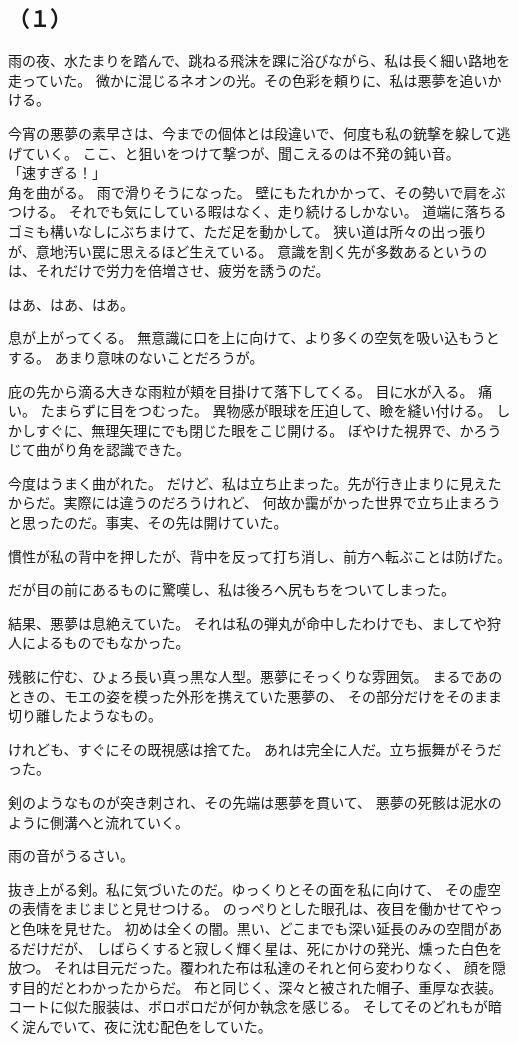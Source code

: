 \documentclass[../IHMain]{subfiles}
\begin{document}
\subsection*{（１）}
雨の夜、水たまりを踏んで、跳ねる飛沫を踝に浴びながら、私は長く細い路地を走っていた。
微かに混じるネオンの光。その色彩を頼りに、私は悪夢を追いかける。

今宵の悪夢の素早さは、今までの個体とは段違いで、何度も私の銃撃を躱して逃げていく。
ここ、と狙いをつけて撃つが、聞こえるのは不発の鈍い音。\\
「速すぎる！」\\
角を曲がる。
雨で滑りそうになった。
壁にもたれかかって、その勢いで肩をぶつける。
それでも気にしている暇はなく、走り続けるしかない。
道端に落ちるゴミも構いなしにぶちまけて、ただ足を動かして。
狭い道は所々の出っ張りが、意地汚い罠に思えるほど生えている。
意識を割く先が多数あるというのは、それだけで労力を倍増させ、疲労を誘うのだ。

はあ、はあ、はあ。

息が上がってくる。
無意識に口を上に向けて、より多くの空気を吸い込もうとする。
あまり意味のないことだろうが。

庇の先から滴る大きな雨粒が頬を目掛けて落下してくる。
目に水が入る。
痛い。
たまらずに目をつむった。
異物感が眼球を圧迫して、瞼を縫い付ける。
しかしすぐに、無理矢理にでも閉じた眼をこじ開ける。
ぼやけた視界で、かろうじて曲がり角を認識できた。

今度はうまく曲がれた。
だけど、私は立ち止まった。先が行き止まりに見えたからだ。実際には違うのだろうけれど、
何故か靄がかった世界で立ち止まろうと思ったのだ。事実、その先は開けていた。

慣性が私の背中を押したが、背中を反って打ち消し、前方へ転ぶことは防げた。

だが目の前にあるものに驚嘆し、私は後ろへ尻もちをついてしまった。

結果、悪夢は息絶えていた。
それは私の弾丸が命中したわけでも、ましてや狩人によるものでもなかった。

残骸に佇む、ひょろ長い真っ黒な人型。悪夢にそっくりな雰囲気。
まるであのときの、モエの姿を模った外形を携えていた悪夢の、
その部分だけをそのまま切り離したようなもの。

けれども、すぐにその既視感は捨てた。
あれは完全に人だ。立ち振舞がそうだった。

剣のようなものが突き刺され、その先端は悪夢を貫いて、
悪夢の死骸は泥水のように側溝へと流れていく。

雨の音がうるさい。

抜き上がる剣。私に気づいたのだ。ゆっくりとその面を私に向けて、
その虚空の表情をまじまじと見せつける。
のっぺりとした眼孔は、夜目を働かせてやっと色味を見せた。
初めは全くの闇。黒い、どこまでも深い延長のみの空間があるだけだが、
しばらくすると寂しく輝く星は、死にかけの発光、燻った白色を放つ。
それは目元だった。覆われた布は私達のそれと何ら変わりなく、
顔を隠す目的だとわかったからだ。
布と同じく、深々と被された帽子、重厚な衣装。
コートに似た服装は、ボロボロだが何か執念を感じる。
そしてそのどれもが暗く淀んでいて、夜に沈む配色をしていた。
\end{document}

